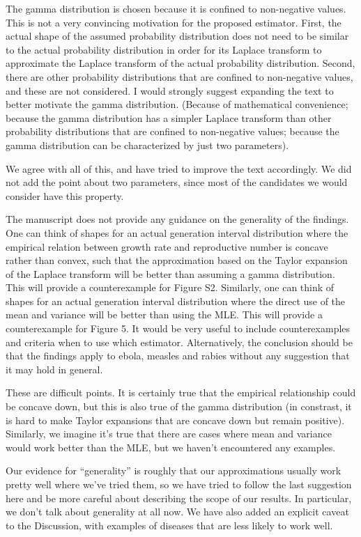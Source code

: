\documentclass[12pt]{article}
\newcommand{\revtext}{\textsf}
\begin{document}
\revtext{The gamma distribution is chosen because it is confined to non-negative values. This is not a very convincing motivation for the proposed estimator. First, the actual shape of the assumed probability distribution does not need to be similar to the actual probability distribution in order for its Laplace transform to approximate the Laplace transform of the actual probability distribution. Second, there are other probability distributions that are confined to non-negative values, and these are not considered. I would strongly suggest expanding the text to better motivate the gamma distribution. (Because of mathematical convenience; because the gamma distribution has a simpler Laplace transform than other probability distributions that are confined to non-negative values; because the gamma distribution can be characterized by just two parameters).}

We agree with all of this, and have tried to improve the text accordingly. We did not add the point about two parameters, since most of the candidates we would consider have this property.

\revtext{The manuscript does not provide any guidance on the generality of the findings. One can think of shapes for an actual generation interval distribution where the empirical relation between growth rate and reproductive number is concave rather than convex, such that the approximation based on the Taylor expansion of the Laplace transform will be better than assuming a gamma distribution. This will provide a counterexample for Figure S2. Similarly, one can think of shapes for an actual generation interval distribution where the direct use of the mean and variance will be better than using the MLE. This will provide a counterexample for Figure 5. It would be very useful to include counterexamples and criteria when to use which estimator. Alternatively, the conclusion should be that the findings apply to ebola, measles and rabies without any suggestion that it may hold in general.}

These are difficult points. It is certainly true that the empirical relationship could be concave down, but this is also true of the gamma distribution (in constrast, it is hard to make Taylor expansions that are concave down but remain positive). Similarly, we imagine it's true that there are cases where mean and variance would work better than the MLE, but we haven't encountered any examples.

Our evidence for ``generality'' is roughly that our approximations usually work pretty well where we've tried them, so we have tried to follow the last suggestion here and be more careful about describing the scope of our results. In particular, we don't talk about generality at all now. We have also added an explicit caveat to the Discussion, with examples of diseases that are less likely to work well.
\end{document}
